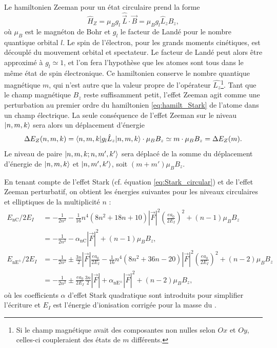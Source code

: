 Le hamiltonien Zeeman pour un état circulaire prend la forme%
\begin{equation}
\label{eq:H_Zeeman}
\hat{H}_Z = \mu_B g_l~\hat{\vec{L}}\cdot\vec{B} = \mu_B g_l\hat{L}_zB_z,
\end{equation}
où $\mu_B$ est le magnéton de Bohr et $g_l$ le facteur de Landé pour le nombre quantique orbital $l$.
Le spin de l'électron, pour les grands moments cinétiques, est découplé du mouvement orbital et spectateur.
Le facteur de Landé peut alors être approximé à $g_l \simeq 1$, et l'on fera l'hypothèse que les atomes sont tous dans le même état de spin électronique.
Ce hamiltonien conserve le nombre quantique magnétique $m$, qui n'est autre que la valeur propre de l'opérateur $\hat{L_z}$\footnote{
Si le champ magnétique avait des composantes non nulles selon $Ox$ et $Oy$, celles-ci coupleraient des états de $m$ différents.}.
Tant que le champ magnétique $B_z$ reste suffisamment petit, l'effet Zeeman agit comme une perturbation au premier ordre du hamiltonien \eqref{eq:hamilt_Stark} de l'atome dans un champ électrique.
La seule conséquence de l'effet Zeeman sur le niveau $\ket{n,m,k}$ sera alors un déplacement d'énergie
\begin{equation}
\label{eq:Zeeman_shift}
\Delta E_Z (n,m,k) = \braket{n,m,k|g_l \hat{L}_z | n,m,k}\cdot \mu_B B_z \simeq m\cdot \mu_B B_z = \Delta E_Z (m).
\end{equation}
Le niveau de paire $\ket{n,m,k ; n,m',k'}$ sera déplacé de la somme du déplacement d'énergie de $\ket{n,m,k}$ et $\ket{n,m',k'}$, soit $(m+m')\mu_B B_z$.

En tenant compte de l'effet Stark (cf. équation \eqref{eq:Stark_circular}) et de l'effet Zeeman perturbatif, on obtient les énergies suivantes pour les niveaux circulaires et elliptiques de la multiplicité $n$ :
\begin{equation}
\label{eq:ener_nC_ZeeStark}
\begin{aligned}
E_{\mathrm{nC}}/2E_I &= -\frac{1}{2n^2} - \frac{1}{16}n^4(8n^2+18n+10)|\vec{F}|^2 \left(\frac{ea_0}{2E_I} \right)^2 + (n-1)\mu_B B_z \\
&= -\frac{1}{2n^2} - \alpha_{\mathrm{nC}}|\vec{F}|^2 + (n-1)\mu_B B_z ,\\
E_{\mathrm{nE^{\pm}}}/2E_I &= -\frac{1}{2n^2} \pm \frac{3n}{2}|\vec{F}|\frac{ea_0}{2E_I} - \frac{1}{16}n^4(8n^2+36n-20)|\vec{F}|^2\left(\frac{ea_0}{2E_I} \right)^2 + (n-2)\mu_B B_z \\
&= -\frac{1}{2n^2} \pm \frac{ea_0}{2E_I}\frac{3n}{2}|\vec{F}| +\alpha_{\mathrm{nE^{\pm}}}|\vec{F}|^2 + (n-2)\mu_B B_z,
\end{aligned}
\end{equation}
où les coefficients $\alpha$ d'effet Stark quadratique sont introduits pour simplifier l'écriture et $E_I$ est l'énergie d'ionisation corrigée pour la masse du .

